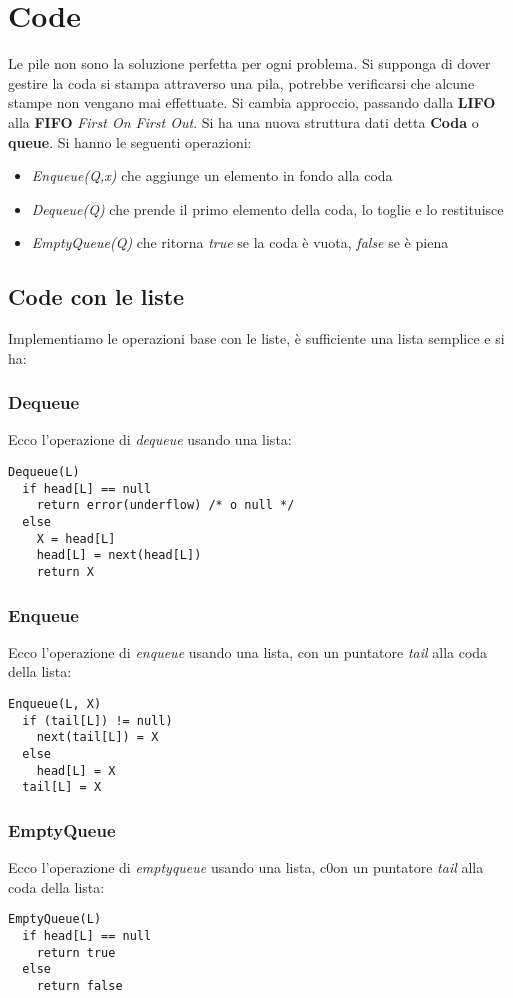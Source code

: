 \documentclass[a4paper,12pt,oneside,tikz]{book}
\begin{document}
\section{Code}
Le pile non sono la soluzione perfetta per ogni problema. Si supponga di dover gestire la coda si stampa attraverso una pila, potrebbe verificarsi che alcune stampe non vengano mai effettuate. Si cambia approccio, passando dalla \textbf{LIFO} alla \textbf{FIFO} \textit{First On First Out}. Si ha una nuova struttura dati detta \textbf{Coda} o \textbf{queue}. Si hanno le seguenti operazioni:
\begin{itemize}
	\item \textit{Enqueue(Q,x)} che aggiunge un elemento in fondo alla coda
	\item \textit{Dequeue(Q)} che prende il primo elemento della coda, lo toglie e lo restituisce
	\item \textit{EmptyQueue(Q)} che ritorna \textit{true} se la coda è vuota, \textit{false} se è piena
\end{itemize}
\subsection{Code con le liste}
Implementiamo le operazioni base con le liste, è sufficiente una lista semplice e si ha:
\subsubsection{Dequeue}
Ecco l'operazione di \textit{dequeue} usando una lista:
\begin{verbatim}
Dequeue(L)
  if head[L] == null
    return error(underflow) /* o null */
  else
    X = head[L]
    head[L] = next(head[L])
    return X
\end{verbatim}
\subsubsection{Enqueue}
Ecco l'operazione di \textit{enqueue} usando una lista, con un puntatore \textit{tail} alla coda della lista:
\begin{verbatim}
Enqueue(L, X)
  if (tail[L]) != null)
    next(tail[L]) = X
  else
    head[L] = X
  tail[L] = X
\end{verbatim}
\subsubsection{EmptyQueue}
Ecco l'operazione di \textit{emptyqueue} usando una lista, c0on un puntatore \textit{tail} alla coda della lista:
\begin{verbatim}
EmptyQueue(L)
  if head[L] == null
    return true
  else
    return false
\end{verbatim}
\end{document}
